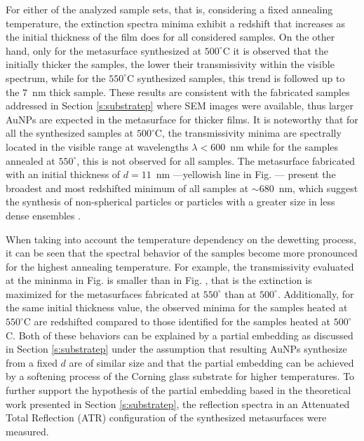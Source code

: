 For either of the analyzed sample sets, that is, considering a fixed annealing temperature, the extinction spectra minima exhibit a redshift that increases as the initial thickness of the film does  for all considered samples. On the other hand, only for the metasurface synthesized at $500^\circ$C it is observed that the initially thicker the samples, the lower their transmissivity within the visible spectrum, while for the $550^\circ$C synthesized samples, this trend is followed up to the $7$~nm thick sample. These results are consistent with the fabricated samples addressed in Section  \ref{s:substratep} where SEM images were available, thus larger AuNPs are expected in the metasurface for thicker films. It is noteworthy that for all the synthesized samples at $500^\circ$C, the transmissivity minima are spectrally located in the visible range at wavelengths $\lambda < 600$~nm while for the samples annealed at $550^\circ$, this is not observed for all samples. The metasurface fabricated with an initial thickness of $d = 11$~nm ---yellowish line in Fig. --- present the broadest and most redshifted minimum of all samples at $\sim 680$~nm, which  suggest the synthesis of non-spherical particles \cite{cuanalo_phase_2024} or particles with a greater size in less dense ensembles \cite{thompson_solid-state_2012}.

When taking into account the temperature dependency on the dewetting process, it can be seen that the spectral behavior of the samples become more pronounced for the highest annealing temperature. For example, the transmissivity evaluated at the mininma in Fig.  is smaller than  in  Fig. , that is the extinction is maximized for the metasurfaces fabricated at $550^\circ$ than at $500^\circ$. Additionally, for the same initial thickness value, the observed minima for the samples heated at $550^\circ$C are redshifted compared to those identified for the samples heated at $500^\circ$C. Both of these behaviors can be explained by a partial embedding as discussed in Section \ref{s:substratep} under the assumption that resulting AuNPs synthesize from a fixed $d$ are of similar size and that the partial embedding can be achieved by a softening process of the  Corning glass substrate  for higher temperatures. To further support the hypothesis of the partial embedding based in the theoretical work presented in Section \ref{s:substratep}, the reflection spectra  in an Attenuated Total Reflection (ATR) configuration of the synthesized metasurfaces were measured.

